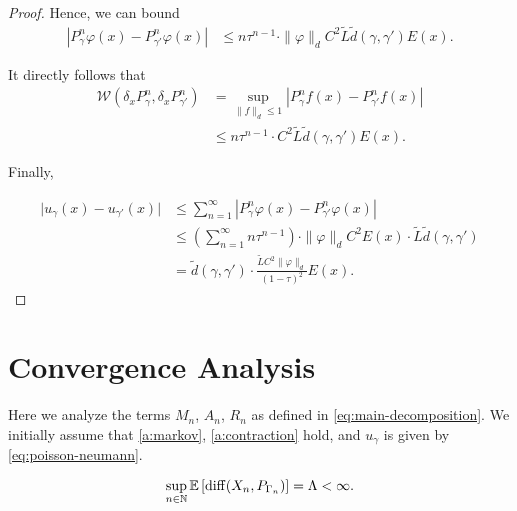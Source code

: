 \begin{lemma}
\begin{proof}
    Hence, we can bound
    \begin{align*}
        \left\vert P_{\gamma}^n\varphi(x)-P_{\gamma'}^n\varphi(x) \right\vert
        &\leq n\tau^{n-1} \cdot \| \varphi \|_d C^2 \tilde{L}  \tilde{d}(\gamma, \gamma') E(x).
    \end{align*}

    It directly follows that
    \begin{align*}
        \mathcal{W}(\delta_xP_{\gamma}^n, \delta_xP_{\gamma'}^n)
        &= \sup_{\| f \|_d \leq 1}  \left\vert P_{\gamma}^n f(x)-P_{\gamma'}^n f(x) \right\vert \\
        &\leq n\tau^{n-1} \cdot C^2 \tilde{L}  \tilde{d}(\gamma, \gamma') E(x).
    \end{align*}
    

    Finally,

    \begin{align*}
        \lvert u_\gamma(x) - u_{\gamma'}(x) \rvert 
        &\leq \sum_{n=1}^{\infty} \left\vert P_{\gamma}^n\varphi(x)-P_{\gamma'}^n\varphi(x) \right\vert \\
        &\leq \left( \sum_{n=1}^{\infty} n\tau^{n-1} \right) \cdot \| \varphi \|_d C^2E(x) \cdot \tilde{L}\tilde{d}(\gamma, \gamma') \\
        &= \tilde{d}(\gamma, \gamma') \cdot \frac{\tilde{L} C^2 \| \varphi \|_d}{(1-\tau)^2} E(x).
    \end{align*}
    
\end{proof}
\end{lemma}

\section{Convergence Analysis}

Here we analyze the terms $M_n$, $A_n$, $R_n$ as defined in \eqref{eq:main-decomposition}.
We initially assume that \ref{a:markov}, \ref{a:contraction} hold, and $u_\gamma$ is given by \eqref{eq:poisson-neumann}.



\begin{assumption}
\label{a:bounded-diffusison}
    \[
    \sup_{n \in \mathbb{N}} \mathbb{E} \left[ \mathrm{diff}(X_n, P_{\Gamma_n}) \right] = \Lambda < \infty.
    \]
\end{assumption}

